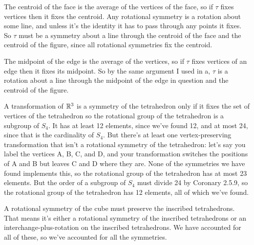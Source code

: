 \documentclass[11pt, oneside]{article}   	%
\begin{document}
\ee
\item \be
\item The centroid of the face is the average of the vertices of the face, so if $\tau$ fixes vertices then it fixes the centroid. Any rotational symmetry is a rotation about some line, and unless it's the identity it has to pass through any points it fixes. So $\tau$ must be a symmetry about a line through the centroid of the face and the centroid of the figure, since all rotational symmetries fix the centroid.
\item The midpoint of the edge is the average of the vertices, so if $\tau$ fixes vertices of an edge then it fixes its midpoint. So by the same argument I used in a, $\tau$ is a rotation about a line through the midpoint of the edge in question and the centroid of the figure.
\ee
\item A transformation of $\mathbb{R}^3$ is a symmetry of the tetrahedron only if it fixes the set of vertices of the tetrahedron so the rotational group of the tetrahedron is a subgroup of $S_4$. It has at least 12 elements, since we've found 12, and at most 24, since that is the cardinality of $S_4$. But there's at least one vertex-preserving transformation that isn't a rotational symmetry of the tetrahedron: let's say you label the vertices A, B, C, and D, and your transformation switches the positions of A and B but leaves C and D where they are. None of the symmetries we have found implements this, so the rotational group of the tetrahedron has at most 23 elements. But the order of a subgroup of $S_4$ must divide 24 by Coronary 2.5.9, so the rotational group of the tetrahedron has 12 elements, all of which we've found.
\item A rotational symmetry of the cube must preserve the inscribed tetrahedrons. That means it's either a rotational symmetry of the inscribed tetrahedrons or an interchange-plus-rotation on the inscribed tetrahedrons. We have accounted for all of these, so we've accounted for all the symmetries.
\ee 
\end{document}

